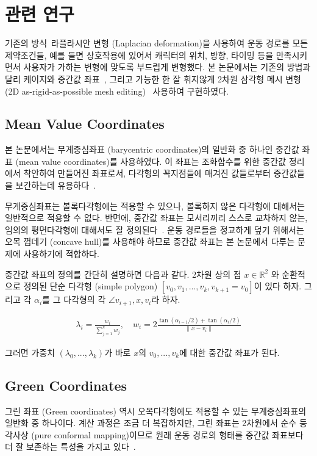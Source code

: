 \documentclass[12pt,a4paper,oneside,final]{report}
\newcommand{\Kim}{\cite{Kim:2009:SMM:1531326.1531385}}
\newcommand{\Igarashi}{\cite{Igarashi:2005:ASM:1073204.1073323}}
\newcommand{\Floater}{\cite{Floater200319}}
\newcommand{\Hormann}{\cite{Hormann:2006:MVC:1183287.1183295}}
\newcommand{\Lipman}{\cite{Lipman:2008:GC:1360612.1360677}}
\providecommand{\norm}[1]{\lVert#1\rVert}
\begin{document}
\chapter{관련 연구}

기존의 방식~ 라플라시안 변형 (Laplacian deformation)을 사용하여 운동
경로를 모든 제약조건들, 예를 들면 상호작용에 있어서 캐릭터의 위치, 방향, 타이밍
등을 만족시키면서 사용자가 가하는 변형에 맞도록 부드럽게 변형했다. 본
논문에서는 기존의 방법과 달리 케이지와 중간값 좌표~\Floater, 그리고 가능한 한
잘 휘지않게 2차원 삼각형 메시 변형 (2D as-rigid-as-possible mesh editing)~
사용하여 구현하였다.

\section{Mean Value Coordinates} 본 논문에서는 무게중심좌표
(barycentric coordinates)의 일반화 중 하나인 중간값 좌표 (mean value
coordinates)를 사용하였다. 이 좌표는 조화함수를 위한 중간값 정리에서 착안하여
만들어진 좌표로서, 다각형의 꼭지점들에 매겨진 값들로부터 중간값들을 보간하는데
유용하다~\Floater.

무게중심좌표는 볼록다각형에는 적용할 수 있으나, 볼록하지 않은 다각형에 대해서는
일반적으로 적용할 수 없다.  반면에, 중간값 좌표는 모서리끼리 스스로 교차하지
않는, 임의의 평면다각형에 대해서도 잘 정의된다~\Hormann. 운동 경로들을 정교하게
덮기 위해서는 오목 껍데기 (concave hull)를 사용해야 하므로 중간값 좌표는 본
논문에서 다루는 문제에 사용하기에 적합하다.

중간값 좌표의 정의를 간단히 설명하면 다음과 같다. 2차원 상의 점 $x \in
\mathbb{R}^2$ 와 순환적으로 정의된 단순 다각형 (simple polygon) $[v_0, v_1,
..., v_k, v_{k+1} = v_0]$이 있다 하자. 그리고 각 $\alpha_i$를 그 다각형의 각
$\angle v_{i+1},x,v_{i}$라 하자.

\begin{align}
\lambda_i = \frac{w_i}{\sum_{j=1}^{k}w_j}, \quad w_i =
2\frac{\tan(\alpha_{i-1}/2) + \tan(\alpha_{i}/2)}{\norm{x - v_i}}
\end{align}

그러면 가중치 $(\lambda_0, ..., \lambda_k)$가 바로 $x$의 $v_0, ...  , v_k$에
대한 중간값 좌표가 된다.

\section{Green Coordinates}
그린 좌표 (Green coordinates) 역시 오목다각형에도 적용할 수 있는
무게중심좌표의 일반화 중 하나이다. 계산 과정은 조금 더 복잡하지만, 그린 좌표는
2차원에서 순수 등각사상 (pure conformal mapping)이므로 원래 운동 경로의 형태를
중간값 좌표보다 더 잘 보존하는 특성을 가지고 있다~\Lipman.
\end{document}
